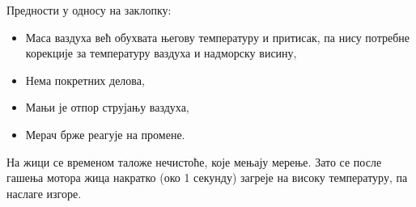 \documentclass[12pt]{article}
\begin{document}
Предности у односу на заклопку:
\begin{itemize}
    \item Маса ваздуха већ обухвата његову температуру и притисак, па нису
          потребне корекције за температуру ваздуха и надморску висину,
    \item Нема покретних делова,
    \item Мањи је отпор струјању ваздуха,
    \item Мерач брже реагује на промене.
\end{itemize}

На жици се временом таложе нечистоће, које мењају мерење. Зато се после
гашења мотора жица накратко (око 1 секунду) загреје на високу температуру, па
наслаге изгоре.
\end{document}
